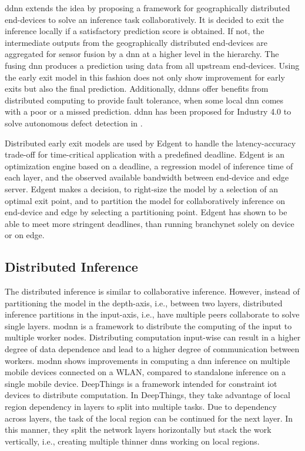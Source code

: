\begin{enumdescript}
	\gls{ddnn} \cite{teerapittayanon_distributed_2017} extends the idea by proposing a framework for geographically distributed end-devices to solve an inference task collaboratively. It is decided to exit the inference locally if a satisfactory prediction score is obtained. If not, the intermediate outputs from the geographically distributed end-devices are aggregated for sensor fusion by a \gls{dnn} at a higher level in the hierarchy. The fusing \gls{dnn} produces a prediction using data from all upstream end-devices. Using the early exit model in this fashion does not only show improvement for early exits but also the final prediction. Additionally, \gls{ddnn}s offer benefits from distributed computing to provide fault tolerance, when some local \gls{dnn} comes with a poor or a missed prediction. \gls{ddnn} has been proposed for Industry 4.0 to solve autonomous defect detection in \cite{li_deep_2018}. 
	
	Distributed early exit models are used by Edgent \cite{li_edge_2018} to handle the latency-accuracy trade-off for time-critical application with a predefined deadline. Edgent is an optimization engine based on a deadline, a regression model of inference time of each layer, and the observed available bandwidth between end-device and edge server. Edgent makes a decision, to right-size the model by a selection of an optimal exit point, and to partition the model for collaboratively inference on end-device and edge by selecting a partitioning point. Edgent has shown to be able to meet more stringent deadlines, than running \gls{branchynet} solely on device or on edge.
\end{enumdescript}

\subsection{Distributed Inference}

The distributed inference is similar to collaborative inference. However, instead of partitioning the model in the depth-axis, i.e., between two layers, distributed inference partitions in the input-axis, i.e., have multiple peers collaborate to solve single layers. \gls{modnn} \cite{mao_modnn:_2017} is a framework to distribute the computing of the input to multiple worker nodes. Distributing computation input-wise can result in a higher degree of data dependence and lead to a higher degree of communication between workers. \gls{modnn} shows improvements in computing a \gls{dnn} inference on multiple mobile devices connected on a WLAN, compared to standalone inference on a single mobile device. DeepThings \cite{zhao_deepthings:_2018} is a framework intended for constraint \gls{iot} devices to distribute computation. In DeepThings, they take advantage of local region dependency in layers to split into multiple tasks. Due to dependency across layers, the task of the local region can be continued for the next layer. In this manner, they split the network layers horizontally but stack the work vertically, i.e., creating multiple thinner \gls{dnn}s working on local regions.
